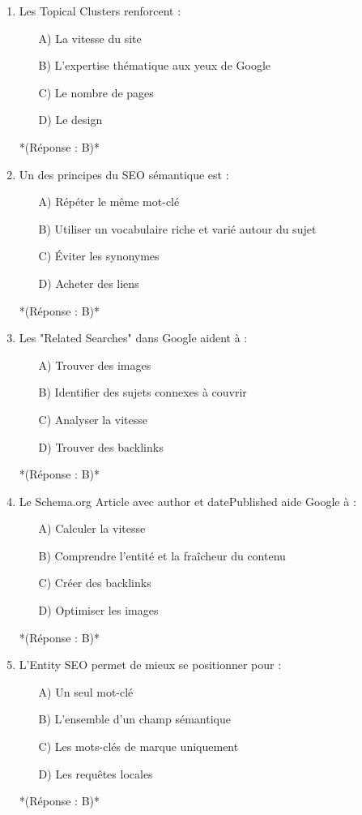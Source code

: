 \documentclass[12pt,a4paper,twoside]{report}
\begin{document}
\begin{enumerate}
\item Les Topical Clusters renforcent :
\begin{itemize}
\item[A)] La vitesse du site
\item[B)] L'expertise thématique aux yeux de Google
\item[C)] Le nombre de pages
\item[D)] Le design
\end{itemize}
*(Réponse : B)*

\item Un des principes du SEO sémantique est :
\begin{itemize}
\item[A)] Répéter le même mot-clé
\item[B)] Utiliser un vocabulaire riche et varié autour du sujet
\item[C)] Éviter les synonymes
\item[D)] Acheter des liens
\end{itemize}
*(Réponse : B)*

\item Les "Related Searches" dans Google aident à :
\begin{itemize}
\item[A)] Trouver des images
\item[B)] Identifier des sujets connexes à couvrir
\item[C)] Analyser la vitesse
\item[D)] Trouver des backlinks
\end{itemize}
*(Réponse : B)*

\item Le Schema.org Article avec author et datePublished aide Google à :
\begin{itemize}
\item[A)] Calculer la vitesse
\item[B)] Comprendre l'entité et la fraîcheur du contenu
\item[C)] Créer des backlinks
\item[D)] Optimiser les images
\end{itemize}
*(Réponse : B)*

\item L'Entity SEO permet de mieux se positionner pour :
\begin{itemize}
\item[A)] Un seul mot-clé
\item[B)] L'ensemble d'un champ sémantique
\item[C)] Les mots-clés de marque uniquement
\item[D)] Les requêtes locales
\end{itemize}
*(Réponse : B)*


\end{enumerate}
\end{document}
